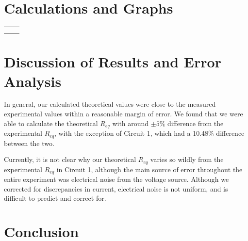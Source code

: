 \documentclass[12pt,letterpaper,titlepage]{report}
\begin{document}
\bigskip
\bigskip



\pagebreak
\section*{Calculations and Graphs}

\begin{minipage}{\linewidth}
    \centering
    \bigskip    
    
    \begin{tabular}{c c}

        \begin{minipage}{.45\linewidth}
            \centering
            Calculated Resistances \\
            \bigskip
            
            \bigskip
            \bigskip %
            \bigskip %
            \bigskip %
            \bigskip %
            \bigskip %
            \bigskip
            \medskip %
            \bigskip
        \end{minipage} &
        
        \begin{minipage}{.5\linewidth}
            \centering
            
        \end{minipage}

    \end{tabular}    
\end{minipage}

\bigskip
\bigskip



\bigskip
\section*{Discussion of Results and Error Analysis}


In general, our calculated theoretical values were close to the measured experimental values within a reasonable margin of error. We found that we were able to calculate the theoretical $R_{eq}$ with around $\pm 5\%$ difference from the experimental $R_{eq}$, with the exception of Circuit 1, which had a 10.48\% difference between the two.

\medskip


Currently, it is not clear why our theoretical $R_{eq}$ varies so wildly from the experimental $R_{eq}$ in Circuit 1, although the main source of error throughout the entire experiment was electrical noise from the voltage source. Although we corrected for discrepancies in current, electrical noise is not uniform, and is difficult to predict and correct for.



\bigskip
\section*{Conclusion}


\end{document}
